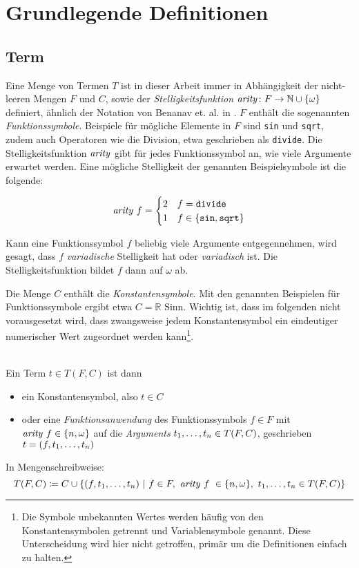 


\chapter{Grundlegende Definitionen} \label{secGrundlegendeDefinitionen}

\section{Term} \label{subsecTerm}
Eine Menge von Termen $T$ ist in dieser Arbeit immer  in Abhängigkeit der nicht-leeren Mengen $F$ und $C$, sowie der \emph{\Gls{Stelligkeitsfunktion}} $\Const{arity} \colon F \rightarrow \mathbb{N} \cup \{\omega\}$ definiert, ähnlich der Notation von Benanav et. al. in \cite{NPHardMatching}. $F$ enthält die sogenannten \emph{Funktionssymbole}. Beispiele für mögliche Elemente in $F$ sind \texttt{sin} und \texttt{sqrt}, zudem auch Operatoren wie die Division, etwa geschrieben als \texttt{divide}. Die Stelligkeitsfunktion $\Const{arity}$ gibt für jedes Funktionssymbol an, wie viele Argumente erwartet werden. Eine mögliche Stelligkeit der genannten Beispielsymbole ist die folgende:

$$\Const{arity}~f = \begin{cases}
2 & f  = \texttt{divide}\\
1 & f \in \{\texttt{sin}, \texttt{sqrt}\}\\
\end{cases}$$

Kann eine \Gls{Funktionssymbol} $f$ beliebig viele Argumente entgegennehmen, wird gesagt, dass $f$ \emph{variadische} Stelligkeit hat oder \emph{\gls{variadisch}} ist. Die Stelligkeitsfunktion bildet $f$ dann auf $\omega$ ab. 

Die Menge $C$ enthält die \emph{Konstantensymbole}. Mit den genannten Beispielen für Funktionssymbole ergibt etwa $C = \mathbb R$ Sinn. Wichtig ist, dass im folgenden nicht vorausgesetzt wird, dass zwangsweise jedem \Gls{Konstantensymbol} ein eindeutiger numerischer Wert zugeordnet werden kann\footnote{Die Symbole unbekannten Wertes werden häufig von den Konstantensymbolen getrennt und Variablensymbole genannt. Diese Unterscheidung wird hier nicht getroffen, primär um die Definitionen einfach zu halten.}.




\begin{definition}\label{defTerm}~\\
Ein \Gls{Term} $t \in T(F, C)$ ist dann  {
\begin{itemize}
	\item{ein \Gls{Konstantensymbol}, also $t \in C$}
	\item{oder eine \emph{\Gls{Funktionsanwendung}} des Funktionssymbols $f \in F$ mit $\Const{arity}~f \in \{n, \omega\}$ 
		auf die \emph{\Glspl{Argument}} ${\tOneN \in T(F, C)}$, geschrieben ${t = (f, \tOneN)}$}
\end{itemize}}
In Mengenschreibweise:
$$T(F, C) \coloneqq C \cup \curl*{
(f, \tOneN)~|
~f\in F,~\Const{arity}~f~ \in \{n, \omega\},~ \tOneN \in T(F, C)
}$$ 
\end{definition}

